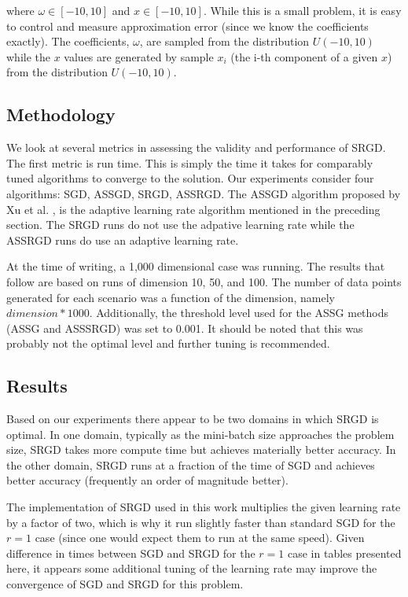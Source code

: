 \documentclass[,conference,compsoc]{IEEEtran}
\begin{document}
where $\omega \in [-10, 10]$ and $x \in [-10, 10]$. While this is a small problem,
it is easy to control and measure approximation error (since we know the
coefficients exactly). The coefficients, $\omega$, are sampled from the
distribution $U(-10, 10)$ while the $x$ values are generated by sample $x_i$ (the
i-th component of a given $x$) from the distribution $U(-10,10)$.

\subsection{Methodology}
We look at several metrics in assessing the validity and performance of SRGD. The
first metric is run time. This is simply the time it takes for comparably tuned
algorithms to converge to the solution. Our experiments consider four
algorithms: SGD, ASSGD, SRGD, ASSRGD. The ASSGD algorithm proposed by Xu et
al. \cite{bib:xu-assgd}, is the adaptive learning rate algorithm mentioned in the
preceding section. The SRGD runs do not use the adpative learning rate while
the ASSRGD runs do use an adaptive learning rate.

At the time of writing, a 1,000 dimensional case was running. The results that
follow are based on runs of dimension 10, 50, and 100. The number of data points
generated for each scenario was a function of the dimension, namely $dimension * 1000$.
Additionally, the threshold level used for the ASSG methods (ASSG and ASSSRGD) was
set to 0.001. It should be noted that this was probably not the optimal level and
further tuning is recommended.

\subsection{Results}
Based on our experiments there appear to be two domains in which SRGD is
optimal. In one domain, typically as the mini-batch size approaches the
problem size, SRGD takes more compute time but achieves materially better
accuracy. In the other domain, SRGD runs at a fraction of the time of
SGD and achieves better accuracy (frequently an order of magnitude better).

The implementation of SRGD used in this work multiplies the given learning
rate by a factor of two, which is why it run slightly faster than standard SGD
for the $r = 1$ case (since one would expect them to run at the same speed).
Given difference in times between SGD and SRGD for the $r = 1$ case in tables
presented here, it appears some additional tuning of the learning rate may
improve the convergence of SGD and SRGD for this problem.
\end{document}
